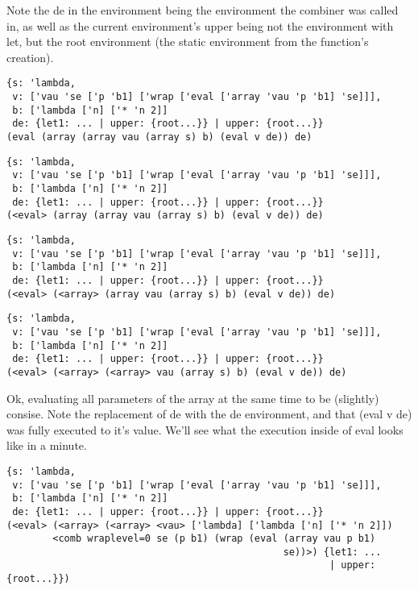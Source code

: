 \documentclass{beamer}
\begin{document}
\begin{frame}[fragile]
Note the de in the environment being the environment the combiner was called in,
as well as the current environment's upper being not the environment with let, but
	the root environment (the static environment from the function's creation).
\footnotesize
\begin{verbatim}
{s: 'lambda,
 v: ['vau 'se ['p 'b1] ['wrap ['eval ['array 'vau 'p 'b1] 'se]]],
 b: ['lambda ['n] ['* 'n 2]]
 de: {let1: ... | upper: {root...}} | upper: {root...}}
(eval (array (array vau (array s) b) (eval v de)) de)
\end{verbatim}
\end{frame}

\begin{frame}[fragile]
\footnotesize
\begin{verbatim}
{s: 'lambda,
 v: ['vau 'se ['p 'b1] ['wrap ['eval ['array 'vau 'p 'b1] 'se]]],
 b: ['lambda ['n] ['* 'n 2]]
 de: {let1: ... | upper: {root...}} | upper: {root...}}
(<eval> (array (array vau (array s) b) (eval v de)) de)
\end{verbatim}
\end{frame}

\begin{frame}[fragile]
\footnotesize
\begin{verbatim}
{s: 'lambda,
 v: ['vau 'se ['p 'b1] ['wrap ['eval ['array 'vau 'p 'b1] 'se]]],
 b: ['lambda ['n] ['* 'n 2]]
 de: {let1: ... | upper: {root...}} | upper: {root...}}
(<eval> (<array> (array vau (array s) b) (eval v de)) de)
\end{verbatim}
\end{frame}

\begin{frame}[fragile]
\footnotesize
\begin{verbatim}
{s: 'lambda,
 v: ['vau 'se ['p 'b1] ['wrap ['eval ['array 'vau 'p 'b1] 'se]]],
 b: ['lambda ['n] ['* 'n 2]]
 de: {let1: ... | upper: {root...}} | upper: {root...}}
(<eval> (<array> (<array> vau (array s) b) (eval v de)) de)
\end{verbatim}
\end{frame}

\begin{frame}[fragile]
Ok, evaluating all parameters of the array at the same time to be (slightly) consise.
	Note the replacement of de with the de environment, and that (eval v de) was fully executed to it's value. We'll see what the execution inside of eval looks like in a minute.
\footnotesize
\begin{verbatim}
{s: 'lambda,
 v: ['vau 'se ['p 'b1] ['wrap ['eval ['array 'vau 'p 'b1] 'se]]],
 b: ['lambda ['n] ['* 'n 2]]
 de: {let1: ... | upper: {root...}} | upper: {root...}}
(<eval> (<array> (<array> <vau> ['lambda] ['lambda ['n] ['* 'n 2]])
        <comb wraplevel=0 se (p b1) (wrap (eval (array vau p b1)
		                                        se))>) {let1: ...
												        | upper: {root...}})
\end{verbatim}
\end{frame}
\end{document}
